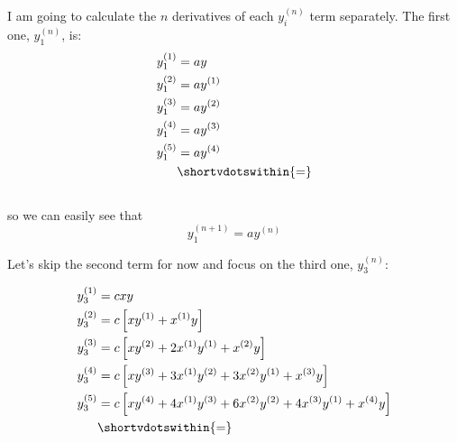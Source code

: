 \documentclass[12pt, a4paper]{article}
\begin{document}
I am going to calculate the $n$ derivatives of each $y^{(n)}_i$ term separately. The first one, $y_1^{(n)}$, is:
\begin{align*}
    y_1^{(1)} &= ay \\
    y_1^{(2)} &= ay^{(1)} \\
    y_1^{(3)} &= ay^{(2)} \\
    y_1^{(4)} &= ay^{(3)} \\
    y_1^{(5)} &= ay^{(4)} \\
              &\shortvdotswithin{=} \notag
\end{align*} \\[-10mm]
so we can easily see that
\begin{equation}\label{ec:primer_termino}
    y_1^{(n+1)} = a y^{(n)}
\end{equation}

Let's skip the second term for now and focus on the third one, $y_3^{(n)}$:

\begin{align*}
    y_3^{(1)} &= c x y \\
    y_3^{(2)} &= c \left[ x y^{(1)} + x^{(1)} y \right] \\
    y_3^{(3)} &= c \left[ x y^{(2)} + 2 x^{(1)} y^{(1)} + x^{(2)} y \right] \\
    y_3^{(4)} &= c \left[ x y^{(3)} + 3 x^{(1)} y^{(2)} + 3 x^{(2)} y^{(1)} + x^{(3)} y \right] \\
    y_3^{(5)} &= c \left[ x y^{(4)} + 4 x^{(1)} y^{(3)} + 6 x^{(2)} y^{(2)} + 4 x^{(3)} y^{(1)} + x^{(4)} y \right] \\
              &\shortvdotswithin{=} \notag
\end{align*} \\[-15mm]
\end{document}
